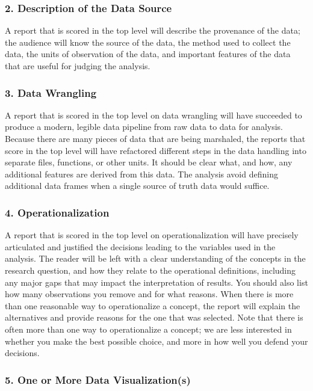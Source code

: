 \documentclass[
  letterpaper,
  DIV=11,
  numbers=noendperiod]{scrartcl}
\begin{document}
\subsubsection{2. Description of the Data
Source}\label{description-of-the-data-source}

A report that is scored in the top level will describe the provenance of
the data; the audience will know the source of the data, the method used
to collect the data, the units of observation of the data, and important
features of the data that are useful for judging the analysis.

\subsubsection{3. Data Wrangling}\label{data-wrangling}

A report that is scored in the top level on data wrangling will have
succeeded to produce a modern, legible data pipeline from raw data to
data for analysis. Because there are many pieces of data that are being
marshaled, the reports that score in the top level will have refactored
different steps in the data handling into separate files, functions, or
other units. It should be clear what, and how, any additional features
are derived from this data. The analysis avoid defining additional data
frames when a single source of truth data would suffice.

\subsubsection{4. Operationalization}\label{operationalization}

A report that is scored in the top level on operationalization will have
precisely articulated and justified the decisions leading to the
variables used in the analysis. The reader will be left with a clear
understanding of the concepts in the research question, and how they
relate to the operational definitions, including any major gaps that may
impact the interpretation of results. You should also list how many
observations you remove and for what reasons. When there is more than
one reasonable way to operationalize a concept, the report will explain
the alternatives and provide reasons for the one that was selected. Note
that there is often more than one way to operationalize a concept; we
are less interested in whether you make the best possible choice, and
more in how well you defend your decisions.

\subsubsection{5. One or More Data
Visualization(s)}\label{one-or-more-data-visualizations}
\end{document}

